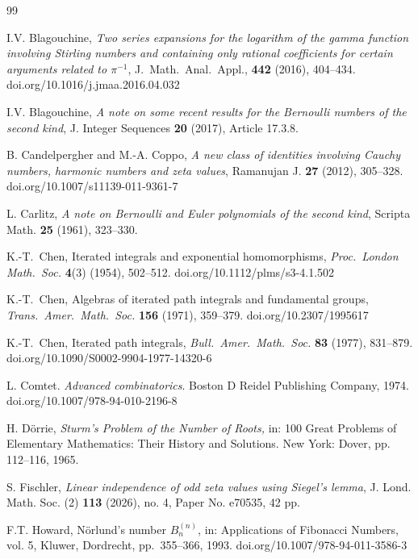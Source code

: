 \documentclass[11pt]{article}
\theoremstyle{plain}
\theoremstyle{definition}
\begin{document}
\begin{thebibliography}{99}

I.V. Blagouchine, \emph{Two series expansions for the logarithm of the gamma function involving Stirling
numbers and containing only rational coefficients for certain arguments related to $\pi^{-1}$}, J.\ Math.\ Anal.\ Appl., \textbf{442} (2016), 404--434. doi.org/10.1016/j.jmaa.2016.04.032

I.V. Blagouchine, \emph{A note on some recent results for the Bernoulli numbers of the second kind},
J. Integer Sequences \textbf{20} (2017), Article 17.3.8.

B. Candelpergher and M.-A. Coppo, \emph{A new class of identities involving Cauchy numbers, harmonic numbers and zeta values}, Ramanujan J. \textbf{27} (2012), 305--328. doi.org/10.1007/s11139-011-9361-7

L. Carlitz, \emph{A note on Bernoulli and Euler polynomials of the second kind}, Scripta Math.  \textbf{25} (1961), 323--330.

K.-T.\ Chen, Iterated integrals and exponential homomorphisms,
\emph{Proc.\ London Math.\ Soc.} \textbf{4}(3) (1954), 502--512. doi.org/10.1112/plms/s3-4.1.502

K.-T.\ Chen, Algebras of iterated path integrals and fundamental groups,
\emph{Trans.\ Amer.\ Math.\ Soc.} \textbf{156} (1971), 359--379. doi.org/10.2307/1995617

K.-T.\ Chen, Iterated path integrals,
\emph{Bull.\ Amer.\ Math.\ Soc.} \textbf{83} (1977), 831--879.  doi.org/10.1090/S0002-9904-1977-14320-6

L. Comtet. {\sl Advanced combinatorics}. Boston D Reidel Publishing Company, 1974. doi.org/10.1007/978-94-010-2196-8

H. D\"orrie,  \emph{Sturm's Problem of the Number of Roots,} in: 100 Great Problems of Elementary Mathematics: Their History and Solutions. New York: Dover, pp. 112--116, 1965.

S. Fischler, \emph{Linear independence of odd zeta values using Siegel's lemma}, J. Lond. Math. Soc. (2) \textbf{113} (2026), no. 4, Paper No. e70535, 42 pp.

F.T. Howard, N\"orlund's number $B^{(n)}_n$, in: Applications of Fibonacci Numbers, vol. 5, Kluwer, Dordrecht, pp.\ 355--366, 1993. doi.org/10.1007/978-94-011-3586-3


\end{thebibliography}
\end{document}

